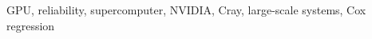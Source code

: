 \documentclass[conference]{IEEEtran}
\begin{document}
\maketitle

\begin{abstract}

\end{abstract}

\begin{IEEEkeywords}
GPU, reliability, supercomputer, NVIDIA, Cray, large-scale systems, Cox regression
\end{IEEEkeywords}













%

\end{document}

